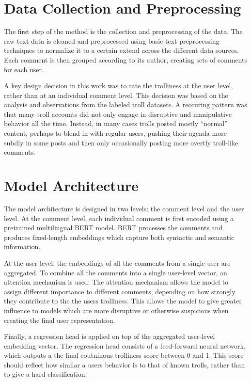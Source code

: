 \documentclass[twoside]{ctuthesis}
\theoremstyle{plain}
\theoremstyle{definition}
\theoremstyle{note}
\begin{document}
\section{Data Collection and Preprocessing}
The first step of the method is the collection and preprocessing of the data. The raw text data is cleaned and preprocessed using basic text preprocessing techniques to normalize it to a certain extend across the different data sources. Each comment is then grouped according to its author, creating sets of comments for each user.\par
A key design decision in this work was to rate the trolliness at the user level, rather than at an individual comment level. This decision was based on the analysis and observations from the labeled troll datasets. A reccuring pattern was that many troll accounts did not only engage in disruptive and manipulative behavior all the time. Instead, in many cases trolls posted mostly ``normal'' content, perhaps to blend in with regular users, pushing their agenda more subdly in some posts and then only occasionally posting more overtly troll-like comments.\par

\section{Model Architecture}
The model architecture is designed in two levels: the comment level and the user level. At the comment level, each individual comment is first encoded using a pretrained multilingual BERT model. BERT processes the comments and produces fixed-length embeddings which capture both syntactic and semantic information.\par
At the user level, the embeddings of all the comments from a single user are aggregated. To combine all the comments into a single user-level vector, an attention mechanism is used. The attention mechanism allows the model to assign different importance to different comments, depending on how strongly they contribute to the the users trolliness. This allows the model to give greater influence to models which are more disruptive or otherwise suspicious when creating the final user representation.\par
Finally, a regression head is applied on top of the aggregated user-level embedding vector. The regression head consists of a feed-forward neural network, which outputs a the final coutninous trolliness score between 0 and 1. This score should reflect how similar a users behavior is to that of known trolls, rather than to give a hard classification.\par
\end{document}

